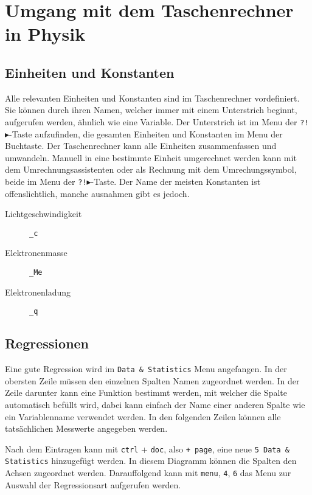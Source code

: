 \documentclass{article}
\begin{document}
\section{Umgang mit dem Taschenrechner in Physik} 
\subsection{Einheiten und Konstanten}
Alle relevanten Einheiten und Konstanten sind im Taschenrechner vordefiniert. Sie können durch ihren Namen, welcher immer mit einem Unterstrich beginnt, aufgerufen werden, ähnlich wie eine Variable. Der Unterstrich ist im Menu der \texttt{?!$\blacktriangleright$}-Taste aufzufinden, die gesamten Einheiten und Konstanten im Menu der Buchtaste. Der Taschenrechner kann alle Einheiten zusammenfassen und umwandeln. Manuell in eine bestimmte Einheit umgerechnet werden kann mit dem Umrechnungsassistenten oder als Rechnung mit dem Umrechungssymbol, beide im Menu der \texttt{?!$\blacktriangleright$}-Taste. \newline
Der Name der meisten Konstanten ist offenslichtlich, manche ausnahmen gibt es jedoch.
\begin{multicols}{3}
 \begin{description}
  \item[Lichtgeschwindigkeit] \texttt{\_c} 
  \item[Elektronenmasse] \texttt{\_Me}
  \item[Elektronenladung] \texttt{\_q} 
 \end{description} 
\end{multicols}  
\subsection{Regressionen}
Eine gute Regression wird im \texttt{Data \& Statistics} Menu angefangen. In der obersten Zeile müssen den einzelnen Spalten Namen zugeordnet werden. In der Zeile darunter kann eine Funktion bestimmt werden, mit welcher die Spalte automatisch befüllt wird, dabei kann einfach der Name einer anderen Spalte wie ein Variablenname verwendet werden. In den folgenden Zeilen können alle tatsächlichen Messwerte angegeben werden.
 
Nach dem Eintragen kann mit \texttt{ctrl} + \texttt{doc}, also \texttt{+ page}, eine neue \texttt{5 Data \& Statistics} hinzugefügt werden. In diesem Diagramm können die Spalten den Achsen zugeordnet werden. Darauffolgend kann mit \texttt{menu}, \texttt{4}, \texttt{6} das Menu zur Auswahl der Regressionsart aufgerufen werden.
 
\end{document}
